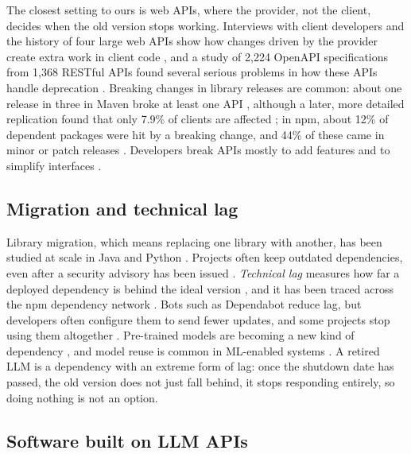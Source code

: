 The closest setting to ours is web APIs, where the provider, not the client, decides when the old version stops working. Interviews with client developers and the history of four large web APIs show how changes driven by the provider create extra work in client code \citep{espinha2014webapi}, and a study of 2,224 OpenAPI specifications from 1,368 RESTful APIs found several serious problems in how these APIs handle deprecation \citep{yasmin2020rest}. Breaking changes in library releases are common: about one release in three in Maven broke at least one API \citep{raemaekers2017semver}, although a later, more detailed replication found that only 7.9\% of clients are affected \citep{ochoa2022breaking}; in npm, about 12\% of dependent packages were hit by a breaking change, and 44\% of these came in minor or patch releases \citep{venturini2023broke}. Developers break APIs mostly to add features and to simplify interfaces \citep{brito2018break}.

\subsection{Migration and technical lag}

Library migration, which means replacing one library with another, has been studied at scale in Java \citep{he2021migration} and Python \citep{islam2024pymig}. Projects often keep outdated dependencies, even after a security advisory has been issued \citep{kula2018update}. \emph{Technical lag} measures how far a deployed dependency is behind the ideal version \citep{zerouali2019lag}, and it has been traced across the npm dependency network \citep{decan2018lag}. Bots such as Dependabot reduce lag, but developers often configure them to send fewer updates, and some projects stop using them altogether \citep{he2023dependabot}. Pre-trained models are becoming a new kind of dependency \citep{yasmin2025deps20}, and model reuse is common in ML-enabled systems \citep{sens2025integration}. A retired LLM is a dependency with an extreme form of lag: once the shutdown date has passed, the old version does not just fall behind, it stops responding entirely, so doing nothing is not an option.

\subsection{Software built on LLM APIs}

